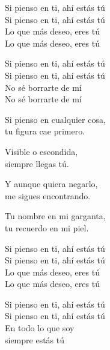 \begin{lyrics}
Si pienso en ti, ahí estás tú\\
Si pienso en ti, ahí estás tú\\
Lo que más deseo, eres tú\\
Lo que más deseo, eres tú

Si pienso en ti, ahí estás tú\\
Si pienso en ti, ahí estás tú\\
No sé borrarte de mí\\
No sé borrarte de mí

Si pienso en cualquier cosa,\\
tu figura cae primero.

Visible o escondida,\\
siempre llegas tú.

Y aunque quiera negarlo,\\
me sigues encontrando.

Tu nombre en mi garganta,\\
tu recuerdo en mi piel.

Si pienso en ti, ahí estás tú\\
Si pienso en ti, ahí estás tú\\
Lo que más deseo, eres tú\\
Lo que más deseo, eres tú

Si pienso en ti, ahí estás tú\\
Si pienso en ti, ahí estás tú\\
En todo lo que soy\\
siempre estás tú
\end{lyrics}

